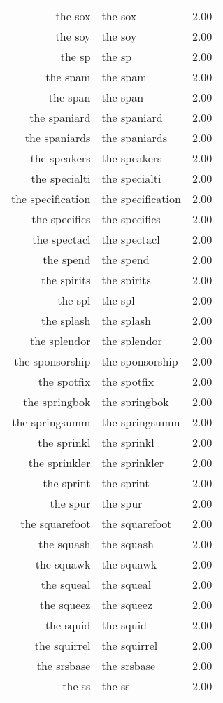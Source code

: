 \begin{table}[ht]
\begin{tabular}{rlr}
  the sox & the sox & 2.00 \\ 
  the soy & the soy & 2.00 \\ 
  the sp & the sp & 2.00 \\ 
  the spam & the spam & 2.00 \\ 
  the span & the span & 2.00 \\ 
  the spaniard & the spaniard & 2.00 \\ 
  the spaniards & the spaniards & 2.00 \\ 
  the speakers & the speakers & 2.00 \\ 
  the specialti & the specialti & 2.00 \\ 
  the specification & the specification & 2.00 \\ 
  the specifics & the specifics & 2.00 \\ 
  the spectacl & the spectacl & 2.00 \\ 
  the spend & the spend & 2.00 \\ 
  the spirits & the spirits & 2.00 \\ 
  the spl & the spl & 2.00 \\ 
  the splash & the splash & 2.00 \\ 
  the splendor & the splendor & 2.00 \\ 
  the sponsorship & the sponsorship & 2.00 \\ 
  the spotfix & the spotfix & 2.00 \\ 
  the springbok & the springbok & 2.00 \\ 
  the springsumm & the springsumm & 2.00 \\ 
  the sprinkl & the sprinkl & 2.00 \\ 
  the sprinkler & the sprinkler & 2.00 \\ 
  the sprint & the sprint & 2.00 \\ 
  the spur & the spur & 2.00 \\ 
  the squarefoot & the squarefoot & 2.00 \\ 
  the squash & the squash & 2.00 \\ 
  the squawk & the squawk & 2.00 \\ 
  the squeal & the squeal & 2.00 \\ 
  the squeez & the squeez & 2.00 \\ 
  the squid & the squid & 2.00 \\ 
  the squirrel & the squirrel & 2.00 \\ 
  the srsbase & the srsbase & 2.00 \\ 
  the ss & the ss & 2.00 \\ 

\end{tabular}
\end{table}

